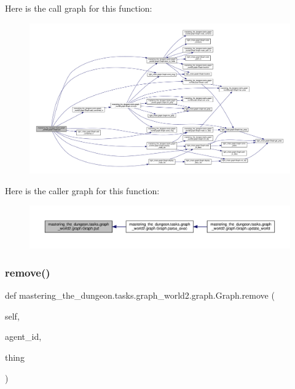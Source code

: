 Here is the call graph for this function\+:
\nopagebreak
\begin{figure}[H]
\begin{center}
\leavevmode
\includegraphics[width=350pt]{classmastering__the__dungeon_1_1tasks_1_1graph__world2_1_1graph_1_1Graph_a2d51681410a2622832e94860e2030737_cgraph}
\end{center}
\end{figure}
Here is the caller graph for this function\+:
\nopagebreak
\begin{figure}[H]
\begin{center}
\leavevmode
\includegraphics[width=350pt]{classmastering__the__dungeon_1_1tasks_1_1graph__world2_1_1graph_1_1Graph_a2d51681410a2622832e94860e2030737_icgraph}
\end{center}
\end{figure}
\mbox{\label{classmastering__the__dungeon_1_1tasks_1_1graph__world2_1_1graph_1_1Graph_ad7707b274f24d19b9e910544b2b8023b}} 
\subsubsection{\texorpdfstring{remove()}{remove()}}
{\footnotesize\ttfamily def mastering\+\_\+the\+\_\+dungeon.\+tasks.\+graph\+\_\+world2.\+graph.\+Graph.\+remove (\begin{DoxyParamCaption}\item[{}]{self,  }\item[{}]{agent\+\_\+id,  }\item[{}]{thing }\end{DoxyParamCaption})}



